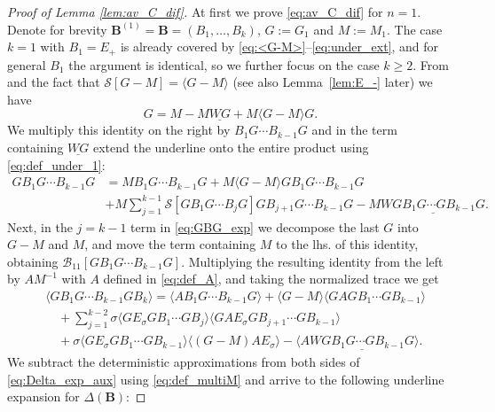 \documentclass[10pt]{amsart}
\numberwithin{equation}{section}
\begin{document}
\begin{proof}[Proof of Lemma \ref{lem:av_C_dif}] At first we prove \eqref{eq:av_C_dif} for $n=1$. Denote for brevity $\bm{B}^{(1)}=\bm{B}=(B_1,\ldots,B_k)$, $G:=G_1$ and $M:=M_1$.  The case $k=1$ with $B_1=E_+$ is already covered by \eqref{eq:<G-M>}--\eqref{eq:under_ext}, and for general $B_1$ the argument is identical, so we further focus on the case $k\ge 2$. From \cite[Eq.(5.2)]{macroCLT_complex} and the fact that $\mathcal{S}[G-M]=\langle G-M\rangle$ (see also Lemma~\ref{lem:E_-} later) we have
\begin{equation}
G=M-M\underline{WG}+M\langle G-M\rangle G.
\label{eq:G_exp}
\end{equation}
We multiply this identity on the right by $B_1G\cdots B_{k-1}G$ and in the term containing $\underline{WG}$ extend the underline onto the entire product using \eqref{eq:def_under_1}:
\begin{equation}
\begin{split}
GB_1G\cdots B_{k-1}G &= MB_1G\cdots B_{k-1}G +M\langle G-M\rangle G B_1G\cdots B_{k-1}G\\
& + M\sum_{j=1}^{k-1}\mathcal{S}[GB_1G\cdots B_jG]GB_{j+1}G\cdots B_{k-1}G-M\underline{WGB_1G\cdots GB_{k-1}G}.
\end{split}
\label{eq:GBG_exp}
\end{equation}
Next, in the $j=k-1$ term in \eqref{eq:GBG_exp} we decompose the last $G$ into $G-M$ and $M$, and move the term containing $M$ to the lhs. of this identity, obtaining $\mathcal{B}_{11}[GB_1G\cdots B_{k-1}G]$. Multiplying the resulting identity from the left by $AM^{-1}$ with $A$ defined in \eqref{eq:def_A}, and taking the normalized trace we get
\begin{equation}
\begin{split}
&\langle GB_1G\cdots B_{k-1}GB_k\rangle = \langle AB_1G\cdots B_{k-1}G\rangle  + \langle G-M\rangle \langle GAGB_1\cdots GB_{k-1}\rangle\\
&\quad + \sum_{j=1}^{k-2}\sigma\langle GE_\sigma GB_1\cdots GB_j\rangle\langle G AE_\sigma G B_{j+1} \cdots GB_{k-1}\rangle\\
&\quad+\sigma\langle GE_\sigma GB_1\cdots GB_{k-1}\rangle \langle (G-M)AE_\sigma\rangle - \langle A\underline{WGB_1G\cdots GB_{k-1}G}\rangle.
\end{split}
\label{eq:Delta_exp_aux}
\end{equation}
We subtract the deterministic approximations from both sides of \eqref{eq:Delta_exp_aux} using \eqref{eq:def_multiM} and arrive to the following underline expansion for $\Delta(\bm{B})$: 

\end{proof}
\end{document}
